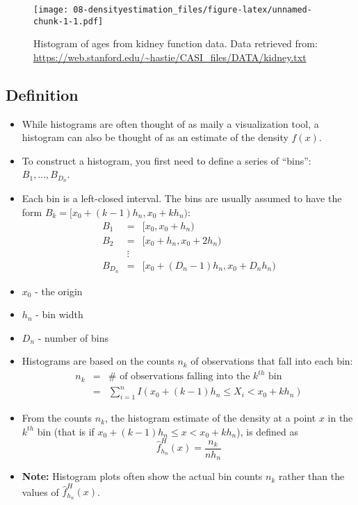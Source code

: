\documentclass[]{book}
\begin{document}
\begin{figure}
\centering
\texttt{[image: 08-densityestimation\_files/figure-latex/unnamed-chunk-1-1.pdf]}
\caption{\label{fig:unnamed-chunk-1}Histogram of ages from kidney function data. Data retrieved from: \url{https://web.stanford.edu/~hastie/CASI_files/DATA/kidney.txt}}
\end{figure}

\hypertarget{definition-5}{%
\subsection{Definition}\label{definition-5}}

\begin{itemize}
\item
  While histograms are often thought of as maily a visualization tool,
  a histogram can also be thought of as an estimate of the density \(f(x)\).
\item
  To construct a histogram, you first need to define a series
  of ``bins'': \(B_{1}, \ldots, B_{D_{n}}\).
\item
  Each bin is a left-closed interval. The bins are usually
  assumed to have the form \(B_{k} = [x_{0} + (k-1)h_{n}, x_{0} + kh_{n})\):
  \begin{eqnarray}
  B_{1} &=& [x_{0}, x_{0} + h_{n}) \nonumber \\
  B_{2} &=& [x_{0} + h_{n}, x_{0} + 2h_{n}) \nonumber \\
  &\vdots& \nonumber \\
  B_{D_{n}} &=& [x_{0} + (D_{n}-1)h_{n}, x_{0} + D_{n}h_{n}) \nonumber 
  \end{eqnarray}
\item
  \(x_{0}\) - the origin
\item
  \(h_{n}\) - bin width
\item
  \(D_{n}\) - number of bins
\item
  Histograms are based on the counts \(n_{k}\) of observations that fall into each bin:
  \begin{eqnarray}
  n_{k} &=& \# \text{ of observations falling into the $k^{th}$ bin }  \nonumber \\
  &=& \sum_{i=1}^{n} I( x_{0} + (k-1)h_{n} \leq X_{i} < x_{0} + kh_{n}  )
  \end{eqnarray}
\item
  From the counts \(n_{k}\), the histogram estimate of the density at a point \(x\) in
  the \(k^{th}\) bin (that is if \(x_{0} + (k-1)h_{n} \leq x < x_{0} + kh_{n}\)), is defined as
  \begin{equation}
  \hat{f}_{h_{n}}^{H}(x) = \frac{n_{k}}{nh_{n}}  
  \label{eq:hist-density}
  \end{equation}
\item
  \textbf{Note:} Histogram plots often show the actual bin counts \(n_{k}\) rather than
  the values of \(\hat{f}_{h_{n}}^{H}(x)\).
\end{itemize}
\end{document}
